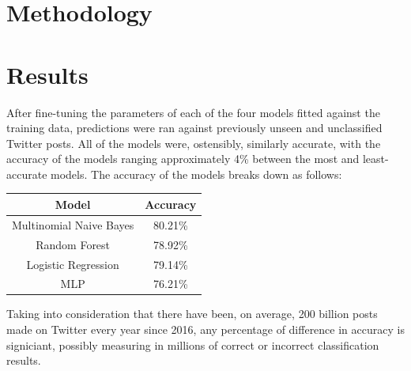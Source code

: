 \documentclass[11pt]{article}
\begin{document}

\section{Methodology}


\section{Results}


After fine-tuning the parameters of each of the four models fitted against the training data, predictions were ran against previously unseen and unclassified Twitter posts. All of the models were, ostensibly, similarly accurate, with the accuracy of the models ranging approximately 4\% between the most and least-accurate models. The accuracy of the models breaks down as follows:

\begin{center}
\begin{tabular}{ |c|c| }
  Model & Accuracy\\
  \hline
  Multinomial Naive Bayes & 80.21\%\\
  Random Forest & 78.92\%\\
  Logistic Regression & 79.14\%\\
  MLP & 76.21\%\\
\end{tabular}
\end{center}

Taking into consideration that there have been, on average, 200 billion posts made on Twitter every year since 2016, any percentage of difference in accuracy is signiciant, possibly measuring in millions of correct or incorrect classification results.
\end{document}
